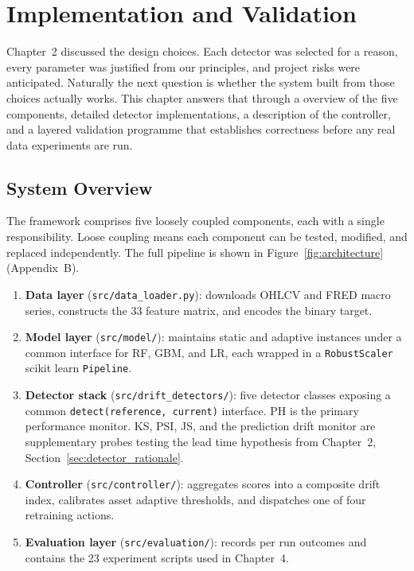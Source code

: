 
\chapter{Implementation and Validation}
\label{ch:implementation}

Chapter~2 discussed the design choices. Each detector was selected for a reason, every parameter was justified from our principles, and project risks were anticipated. Naturally the next question is whether the system built from those choices actually works. This chapter answers that through a overview of the five components, detailed detector implementations, a description of the controller, and a layered validation programme that establishes correctness before any real data experiments are run.

\section{System Overview}
\label{sec:sys_overview}

The framework comprises five loosely coupled components, each with a single responsibility. Loose coupling means each component can be tested, modified, and replaced independently. The full pipeline is shown in Figure~\ref{fig:architecture} (Appendix~B).

\begin{enumerate}
  \item \textbf{Data layer} (\texttt{src/data\_loader.py}): downloads OHLCV and FRED
    macro series, constructs the 33 feature matrix, and encodes the binary target.
  \item \textbf{Model layer} (\texttt{src/model/}): maintains static and adaptive
    instances under a common interface for RF, GBM, and LR, each wrapped in a
    \texttt{RobustScaler} scikit learn \texttt{Pipeline}.
  \item \textbf{Detector stack} (\texttt{src/drift\_detectors/}): five detector
    classes exposing a common \texttt{detect(reference, current)} interface. PH is
    the primary performance monitor. KS, PSI, JS, and the prediction drift monitor
    are supplementary probes testing the lead time hypothesis from Chapter~2,
    Section~\ref{sec:detector_rationale}.
  \item \textbf{Controller} (\texttt{src/controller/}): aggregates scores into a
    composite drift index, calibrates asset adaptive thresholds, and dispatches one
    of four retraining actions.
  \item \textbf{Evaluation layer} (\texttt{src/evaluation/}): records per run
    outcomes and contains the 23 experiment scripts used in Chapter~4.
\end{enumerate}

